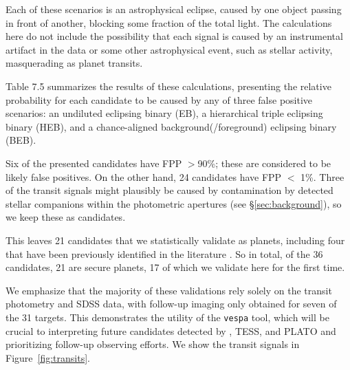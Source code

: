 Each of these scenarios is an astrophysical eclipse, caused by one
object passing in front of another, blocking some fraction of the
total light.
The calculations here do not include the possibility
that each signal is caused by an instrumental artifact in the data or
some other astrophysical event, such as stellar activity, masquerading
as planet transits.

Table 7.5 summarizes the results of these
calculations, presenting the relative probability for each candidate
to be caused by any of three false positive scenarios: an undiluted
eclipsing binary (EB), a hierarchical triple eclipsing binary (HEB),
and a chance-aligned background(/foreground) eclipsing binary (BEB).

Six of the presented candidates have FPP $>$90\%;
these are considered to be likely false positives.
On the other hand, 24 candidates
have FPP $<$ 1\%.
Three of the transit signals might plausibly be caused by
contamination by detected stellar companions within the photometric apertures
(see \S\ref{sec:background}), so we keep these as candidates.

This leaves 21 candidates that we statistically validate as planets, including
four that have been previously
identified in the literature \citep{Crossfield15, Armstrong15b}.
So in total, of the 36 candidates, 21 are secure planets,
17 of which we validate here for the first time.


We emphasize that the majority of these validations rely
solely on the transit photometry and SDSS data, with follow-up imaging only obtained for
seven of the 31 targets.  This
demonstrates the utility of the \texttt{vespa} tool, which will be
crucial to interpreting future candidates detected by \KT, TESS, and PLATO
and prioritizing follow-up observing efforts.
We show the transit signals in Figure~\ref{fig:transits}.

